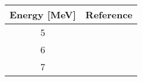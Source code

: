 \begin{tabular}{|c||c|} 
    \hline 
    \bf{Energy [MeV]} & \bf{Reference} \\
    \hline
    \hline 
    5 & \cite{Korzh80}\\
    6 & \cite{Korzh80}\\
    7 & \cite{Korzh80}\\
    \hline
\end{tabular}
